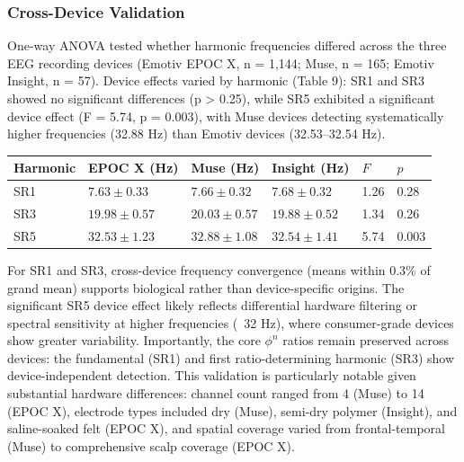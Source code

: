 \documentclass[11pt,a4paper]{article}
\begin{document}
\subsubsection{Cross-Device Validation}
One-way ANOVA tested whether harmonic frequencies differed across the three EEG recording devices (Emotiv EPOC X, n = 1,144; Muse, n = 165; Emotiv Insight, n = 57). Device effects varied by harmonic (Table 9): SR1 and SR3 showed no significant differences (p > 0.25), while SR5 exhibited a significant device effect (F = 5.74, p = 0.003), with Muse devices detecting systematically higher frequencies (32.88 Hz) than Emotiv devices (32.53–32.54 Hz).
\begin{table}[H]
    \centering
    \begin{tabular}{llllll}
        \toprule
        Harmonic & EPOC X (Hz) & Muse (Hz) & Insight (Hz) & $F$ & $p$ \\
        \midrule
        SR1 & $7.63 \pm 0.33$ & $7.66 \pm 0.32$ & $7.68 \pm 0.32$ & 1.26 & 0.28 \\
        SR3 & $19.98 \pm 0.57$ & $20.03 \pm 0.57$ & $19.88 \pm 0.52$ & 1.34 & 0.26 \\
        SR5 & $32.53 \pm 1.23$ & $32.88 \pm 1.08$ & $32.54 \pm 1.41$ & 5.74 & 0.003 \\
        \bottomrule
    \end{tabular} \end{table}
For SR1 and SR3, cross-device frequency convergence (means within 0.3\% of grand mean) supports biological rather than device-specific origins. The significant SR5 device effect likely reflects differential hardware filtering or spectral sensitivity at higher frequencies (~32 Hz), where consumer-grade devices show greater variability. Importantly, the core $\phi^n$ ratios remain preserved across devices: the fundamental (SR1) and first ratio-determining harmonic (SR3) show device-independent detection. This validation is particularly notable given substantial hardware differences: channel count ranged from 4 (Muse) to 14 (EPOC X), electrode types included dry (Muse), semi-dry polymer (Insight), and saline-soaked felt (EPOC X), and spatial coverage varied from frontal-temporal (Muse) to comprehensive scalp coverage (EPOC X).
\end{document}

